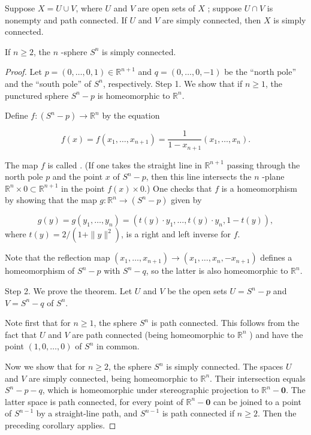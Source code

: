 \begin{corollary}
\label{cor:\thetheorem}
Suppose \(X = U \cup V\), where \(U\) and \(V\) are open sets of \(X\) ; suppose \(U \cap V\) is nonempty and path connected. If \(U\) and \(V\) are simply connected, then \(X\) is simply connected.
\end{corollary}

\begin{theorem}
\label{thm:\thetheorem}
If \(n \geq 2\), the \(n\) -sphere \(S^{n}\) is simply connected.
\end{theorem}

\begin{proof}
Let \(p = ( {0,\ldots, 0,1}) \in {\mathbb{R}}^{n + 1}\) and \(q = ( {0,\ldots, 0, - 1})\) be the ``north pole'' and the ``south pole'' of \(S^{n}\), respectively.
Step 1. We show that if \(n \geq 1\), the punctured sphere \(S^{n} - p\) is homeomorphic to \(\mathbb{R}^{n}\).

Define \(f : ( {S^{n} - p}) \rightarrow {\mathbb{R}}^{n}\) by the equation

\[
f(x) = f( {x_{1},\ldots ,x_{n + 1}}) = \frac{1}{1 - x_{n + 1}}( {x_{1},\ldots ,x_{n}}).
\]

The map \(f\) is called . (If one takes the straight line in \(\mathbb{R}^{n + 1}\) passing through the north pole \(p\) and the point \(x\) of \(S^{n} - p\), then this line intersects the \(n\) -plane \(\mathbb{R}^{n} \times 0 \subset {\mathbb{R}}^{n + 1}\) in the point \(f(x) \times 0\).) One checks that \(f\) is a homeomorphism by showing that the map \(g : \mathbb{R}^{n} \rightarrow ( {S^{n} - p})\) given by

\[
g( y) = g( {y_{1},\ldots ,y_{n}}) = ( {t( y) \cdot {y}_{1},\ldots, t( y) \cdot {y}_{n},1 - t( y) }),
\]
where \(t( y) = 2/( {1 + \parallel y{\parallel }^{2}})\), is a right and left inverse for \(f\).

Note that the reflection map \(( {x_{1},\ldots ,x_{n + 1}}) \rightarrow ( {x_{1},\ldots ,x_{n}, - x_{n + 1}})\) defines a homeomorphism of \(S^{n} - p\) with \(S^{n} - q\), so the latter is also homeomorphic to \(\mathbb{R}^{n}\).

Step 2. We prove the theorem. Let \(U\) and \(V\) be the open sets \(U = S^{n} - p\) and \(V = S^{n} - q\) of \(S^{n}.\)

Note first that for \(n \geq 1\), the sphere \(S^{n}\) is path connected. This follows from the fact that \(U\) and \(V\) are path connected (being homeomorphic to \(\mathbb{R}^{n}\) ) and have the point \(( {1,0,\ldots, 0})\) of \(S^{n}\) in common.

Now we show that for \(n \geq 2\), the sphere \(S^{n}\) is simply connected. The spaces \(U\) and \(V\) are simply connected, being homeomorphic to \(\mathbb{R}^{n}\). Their intersection equals \(S^{n} - p - q\), which is homeomorphic under stereographic projection to \(\mathbb{R}^{n} - \mathbf{0}\). The latter space is path connected, for every point of \(\mathbb{R}^{n} - \mathbf{0}\) can be joined to a point of \(S^{n - 1}\) by a straight-line path, and \(S^{n - 1}\) is path connected if \(n \geq 2\). Then the preceding corollary applies.
\end{proof}
